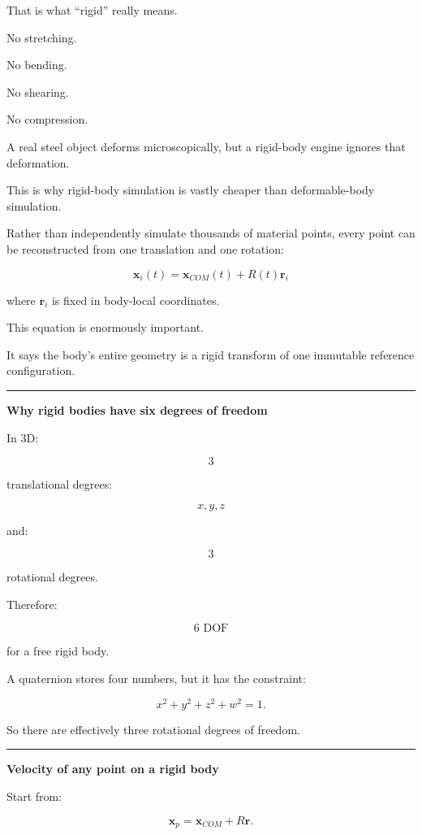 That is what ``rigid'' really means.

No stretching.

No bending.

No shearing.

No compression.

A real steel object deforms microscopically, but a rigid-body engine ignores that deformation.

This is why rigid-body simulation is vastly cheaper than deformable-body simulation.

Rather than independently simulate thousands of material points, every point can be reconstructed from one translation and one rotation:

\[
\boxed{
\mathbf{x}_i(t)
=
\mathbf{x}_{COM}(t)
+
R(t)\mathbf{r}_i
}
\]

where \(\mathbf{r}_i\) is fixed in body-local coordinates.

This equation is enormously important.

It says the body's entire geometry is a rigid transform of one immutable reference configuration.

\begin{center}\rule{0.5\linewidth}{0.5pt}\end{center}

\textbf{Why rigid bodies have six degrees of freedom}

In 3D:

\[
3
\]

translational degrees:

\[
x,y,z
\]

and:

\[
3
\]

rotational degrees.

Therefore:

\[
\boxed{6\text{ DOF}}
\]

for a free rigid body.

A quaternion stores four numbers, but it has the constraint:

\[
x^2+y^2+z^2+w^2=1.
\]

So there are effectively three rotational degrees of freedom.

\begin{center}\rule{0.5\linewidth}{0.5pt}\end{center}

\textbf{Velocity of any point on a rigid body}

Start from:

\[
\mathbf{x}_p
=
\mathbf{x}_{COM}
+
R\mathbf{r}.
\]

